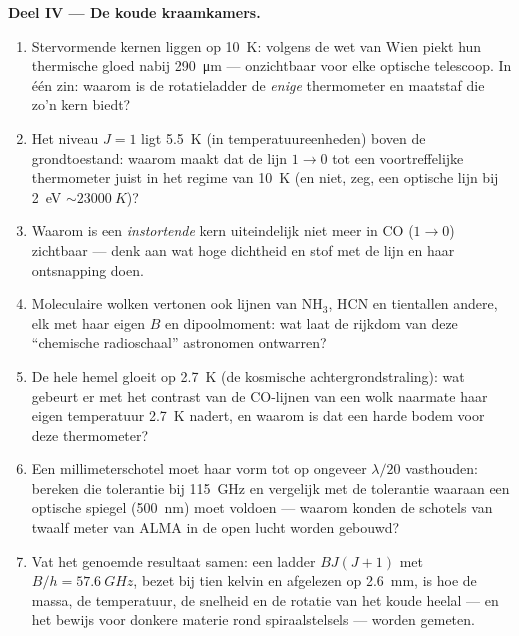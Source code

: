 \begin{problem}
\medskip\noindent\textbf{Deel IV --- De koude kraamkamers.}
\begin{enumerate}[resume]
  \item Stervormende kernen liggen op \qty{10}{K}: volgens de wet van
        Wien piekt hun thermische gloed nabij \qty{290}{\micro m} ---
        onzichtbaar voor elke optische telescoop. In één zin: waarom is
        de rotatieladder de \emph{enige} thermometer en maatstaf die zo'n
        kern biedt?
  \item Het niveau $J = 1$ ligt \qty{5.5}{K} (in temperatuureenheden)
        boven de grondtoestand: waarom maakt dat de lijn $1\to0$ tot een
        voortreffelijke thermometer juist in het regime van \qty{10}{K}
        (en niet, zeg, een optische lijn bij \qty{2}{eV} $\sim \qty{23000}{K}$)?
  \item Waarom is een \emph{instortende} kern uiteindelijk niet meer in
        CO ($1\to0$) zichtbaar --- denk aan wat hoge dichtheid en stof met
        de lijn en haar ontsnapping doen.
  \item Moleculaire wolken vertonen ook lijnen van NH$_3$, HCN en
        tientallen andere, elk met haar eigen $B$ en dipoolmoment: wat
        laat de rijkdom van deze ``chemische radioschaal'' astronomen
        ontwarren?
  \item De hele hemel gloeit op \qty{2.7}{K} (de kosmische
        achtergrondstraling): wat gebeurt er met het contrast van de
        CO-lijnen van een wolk naarmate haar eigen temperatuur
        \qty{2.7}{K} nadert, en waarom is dat een harde bodem voor deze
        thermometer?
  \item Een millimeterschotel moet haar vorm tot op ongeveer
        $\lambda/20$ vasthouden: bereken die tolerantie bij
        \qty{115}{GHz} en vergelijk met de tolerantie waaraan een
        optische spiegel (\qty{500}{nm}) moet voldoen --- waarom konden
        de schotels van twaalf meter van ALMA in de open lucht worden
        gebouwd?
  \item Vat het genoemde resultaat samen: een ladder $BJ(J+1)$ met $B/h =
        \qty{57.6}{GHz}$, bezet bij tien kelvin en afgelezen op
        \qty{2.6}{mm}, is hoe de massa, de temperatuur, de snelheid en de
        rotatie van het koude heelal --- en het bewijs voor donkere
        materie rond spiraalstelsels --- worden gemeten.
\end{enumerate}
\end{problem}
